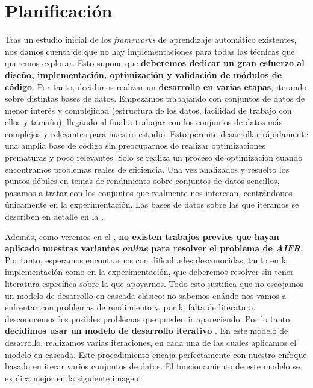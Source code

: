 \section{Planificación} \label{isec:planificacion}

Tras un estudio inicial de los \textit{frameworks} de aprendizaje automático existentes, nos damos cuenta de que no hay implementaciones para todas las técnicas que queremos explorar. Esto supone que \textbf{deberemos dedicar un gran esfuerzo al diseño, implementación, optimización y validación de módulos de código}. Por tanto, decidimos realizar un \textbf{desarrollo en varias etapas}, iterando sobre distintas bases de datos. Empezamos trabajando con conjuntos de datos de menor interés y complejidad (estructura de los datos, facilidad de trabajo con ellos y tamaño), llegando al final a trabajar con los conjuntos de datos más complejos y relevantes para nuestro estudio. Esto permite desarrollar rápidamente una amplia base de código sin preocuparnos de realizar optimizaciones prematuras y poco relevantes. Solo se realiza un proceso de optimización cuando encontramos problemas reales de eficiencia. Una vez analizados y resuelto los puntos débiles en temas de rendimiento sobre conjuntos de datos sencillos, pasamos a tratar con los conjuntos que realmente nos interesan, centrándonos únicamente en la experimentación. Las bases de datos sobre las que iteramos se describen en detalle en la .

Además, como veremos en el , \textbf{no existen trabajos previos que hayan aplicado nuestras variantes \textit{online} para resolver el problema de \textit{AIFR}}. Por tanto, esperamos encontrarnos con dificultades desconocidas, tanto en la implementación como en la experimentación, que deberemos resolver sin tener literatura específica sobre la que apoyarnos. Todo esto justifica que no escojamos un modelo de desarrollo en cascada clásico: no sabemos cuándo nos vamos a enfrentar con problemas de rendimiento y, por la falta de literatura, desconocemos los posibles problemas que pueden ir apareciendo. Por lo tanto, \textbf{decidimos usar un modelo de desarrollo iterativo} \cite{informatica:libro_metodologias_desarrollo}. En este modelo de desarrollo, realizamos varias iteraciones, en cada una de las cuales aplicamos el modelo en cascada. Este procedimiento encaja perfectamente con nuestro enfoque basado en iterar varios conjuntos de datos. El funcionamiento de este modelo se explica mejor en la siguiente imagen:

